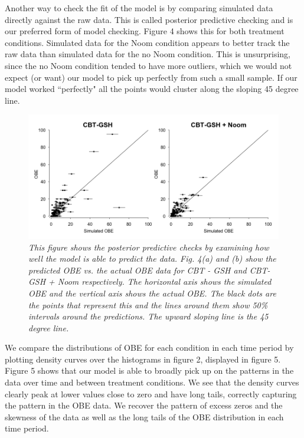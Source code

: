 \documentclass{article}
\begin{document}
%
Another way to check the fit of the model is by comparing simulated data directly against the raw data.  This is called posterior predictive checking and is our preferred form of model checking. Figure 4 shows this for both treatment conditions.  Simulated data for the Noom condition appears to better track the raw data than simulated data for the no Noom condition.  This is unsurprising, since the no Noom condition tended to have more outliers, which we would not expect (or want) our model to pick up perfectly from such a small sample. If our model worked ``perfectly" all the points would cluster along the sloping 45 degree line.
%
\begin{figure}[H]
\begin{center}
\includegraphics[width=\textwidth, height=\textheight, keepaspectratio]{obe_ppcs.png}
\caption{\emph{This figure shows the posterior predictive checks by examining how well the model is able to predict the data. Fig. 4(a) and (b) show the predicted OBE vs. the actual OBE data for CBT - GSH and CBT- GSH + Noom respectively. The horizontal axis shows the simulated OBE and the vertical axis shows the actual OBE. The black dots are the points that represent this and the lines around them show 50\% intervals around the predictions. The upward sloping line is the 45 degree line.}}
\end{center}
\end{figure}
%
We compare the distributions of OBE for each condition in each time period by plotting density curves over the histograms in figure 2, displayed in figure 5. Figure 5 shows that our model is able to broadly pick up on the patterns in the data over time and between treatment conditions. We see that the density curves clearly peak at lower values close to zero and have long tails, correctly capturing the pattern in the OBE data. We recover the pattern of excess zeros and the skewness of the data as well as the long tails of the OBE distribution in each time period.
\end{document}
